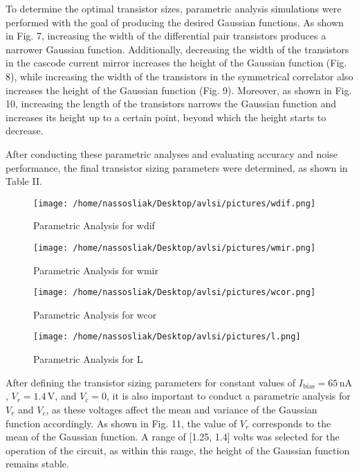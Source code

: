 \documentclass[conference]{IEEEtran}
\begin{document}
To determine the optimal transistor sizes, parametric analysis simulations were performed with the goal of producing the desired Gaussian functions. As shown in Fig. 7, increasing the width of the differential pair transistors produces a narrower Gaussian function. Additionally, decreasing the width of the transistors in the cascode current mirror increases the height of the Gaussian function (Fig. 8), while increasing the width of the transistors in the symmetrical correlator also increases the height of the Gaussian function (Fig. 9). Moreover, as shown in Fig. 10, increasing the length of the transistors narrows the Gaussian function and increases its height up to a certain point, beyond which the height starts to decrease.

After conducting these parametric analyses and evaluating accuracy and noise performance, the final transistor sizing parameters were determined, as shown in Table II.\\

\begin{figure}[!h]
    \centering
    \texttt{[image: /home/nassosliak/Desktop/avlsi/pictures/wdif.png]}
    \caption{Parametric Analysis for wdif}
    \label{fig:wdif}
\end{figure}

\begin{figure}[!h]
    \centering
    \texttt{[image: /home/nassosliak/Desktop/avlsi/pictures/wmir.png]}
    \caption{Parametric Analysis for wmir}
    \label{fig:wmir}
\end{figure}

\begin{figure}[!h]
    \centering
    \texttt{[image: /home/nassosliak/Desktop/avlsi/pictures/wcor.png]}
    \caption{Parametric Analysis for wcor}
    \label{fig:wcor}
\end{figure}

\begin{figure}[!h]
    \centering
    \texttt{[image: /home/nassosliak/Desktop/avlsi/pictures/l.png]}
    \caption{Parametric Analysis for L}
    \label{fig:l}
\end{figure}

After defining the transistor sizing parameters for constant values of \( I_{\text{bias}} = 65 \, \text{nA} \), \( V_r = 1.4 \, \text{V} \), and \( V_c = 0 \), it is also important to conduct a parametric analysis for \( V_r \) and \( V_c \), as these voltages affect the mean and variance of the Gaussian function accordingly. As shown in Fig. 11, the value of \( V_r \) corresponds to the mean of the Gaussian function. A range of [1.25, 1.4] volts was selected for the operation of the circuit, as within this range, the height of the Gaussian function remains stable. 
\end{document}
